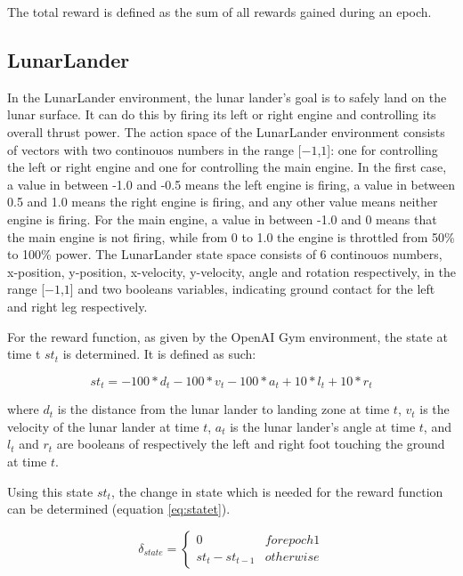 The total reward is defined as the sum of all rewards gained during an epoch.

\subsection{LunarLander}
In the LunarLander environment, the lunar lander's goal is to safely land on the lunar surface. It can do this by firing its left or right engine and controlling its overall thrust power. The action space of the LunarLander environment consists of vectors with two continouos numbers in the range [$-1$,$1$]: one for controlling the left or right engine and one for controlling the main engine. In the first case, a value in between -1.0 and -0.5 means the left engine is firing, a value in between 0.5 and 1.0 means the right engine is firing, and any other value means neither engine is firing. For the main engine, a value in between -1.0 and 0 means that the main engine is not firing, while from 0 to 1.0 the engine is throttled from 50\% to 100\% power. The LunarLander state space consists of 6 continouos numbers, x-position, y-position, x-velocity, y-velocity, angle and rotation respectively, in the range [$-1$,$1$] and two booleans variables, indicating ground contact for the left and right leg respectively.

For the reward function, as given by the OpenAI Gym environment, the state at time t $st_t$ is determined. It is defined as such:

\begin{equation} 
    st_t = -100 * d_t - 100 * v_t - 100 * a_t + 10*l_t + 10*r_t
\end{equation}

where $d_t$ is the distance from the lunar lander to landing zone at time $t$, $v_t$ is the velocity of the lunar lander at time $t$, $a_t$ is the lunar lander's angle at time $t$, and $l_t$ and $r_t$ are booleans of respectively the left and right foot touching the ground at time $t$.  

Using this state $st_t$, the change in state which is needed for the reward function can be determined (equation \ref{eq:statet}). 

\begin{equation}
\label{eq:statet}
    \delta _{state} =
    \begin{cases*}
      0  & for epoch 1 \\
      st_t - st _{t-1} & otherwise 
    \end{cases*}
\end{equation}

